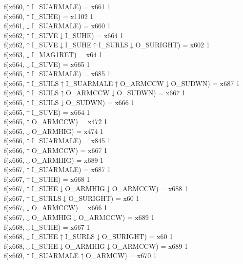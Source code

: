 f(x660,$\uparrow$I\_SUARMALE) = x661 {1} \\
f(x660,$\uparrow$I\_SUHE) = x1102 {1} \\
f(x661,$\downarrow$I\_SUARMALE) = x660 {1} \\
f(x662,$\uparrow$I\_SUVE$\downarrow$I\_SUHE) = x664 {1} \\
f(x662,$\uparrow$I\_SUVE$\downarrow$I\_SUHE$\uparrow$I\_SURLS$\downarrow$O\_SURIGHT) = x602 {1} \\
f(x663,$\downarrow$I\_MAG1RET) = x64 {1} \\
f(x664,$\downarrow$I\_SUVE) = x665 {1} \\
f(x665,$\uparrow$I\_SUARMALE) = x685 {1} \\
f(x665,$\uparrow$I\_SUILS$\uparrow$I\_SUARMALE$\uparrow$O\_ARMCCW$\downarrow$O\_SUDWN) = x687 {1} \\
f(x665,$\uparrow$I\_SUILS$\uparrow$O\_ARMCCW$\downarrow$O\_SUDWN) = x667 {1} \\
f(x665,$\uparrow$I\_SUILS$\downarrow$O\_SUDWN) = x666 {1} \\
f(x665,$\uparrow$I\_SUVE) = x664 {1} \\
f(x665,$\uparrow$O\_ARMCCW) = x472 {1} \\
f(x665,$\downarrow$O\_ARMHIG) = x474 {1} \\
f(x666,$\uparrow$I\_SUARMALE) = x845 {1} \\
f(x666,$\uparrow$O\_ARMCCW) = x667 {1} \\
f(x666,$\downarrow$O\_ARMHIG) = x689 {1} \\
f(x667,$\uparrow$I\_SUARMALE) = x687 {1} \\
f(x667,$\uparrow$I\_SUHE) = x668 {1} \\
f(x667,$\uparrow$I\_SUHE$\downarrow$O\_ARMHIG$\downarrow$O\_ARMCCW) = x688 {1} \\
f(x667,$\uparrow$I\_SURLS$\downarrow$O\_SURIGHT) = x60 {1} \\
f(x667,$\downarrow$O\_ARMCCW) = x666 {1} \\
f(x667,$\downarrow$O\_ARMHIG$\downarrow$O\_ARMCCW) = x689 {1} \\
f(x668,$\downarrow$I\_SUHE) = x667 {1} \\
f(x668,$\downarrow$I\_SUHE$\uparrow$I\_SURLS$\downarrow$O\_SURIGHT) = x60 {1} \\
f(x668,$\downarrow$I\_SUHE$\downarrow$O\_ARMHIG$\downarrow$O\_ARMCCW) = x689 {1} \\
f(x669,$\uparrow$I\_SUARMALE$\uparrow$O\_ARMCW) = x670 {1} \\
